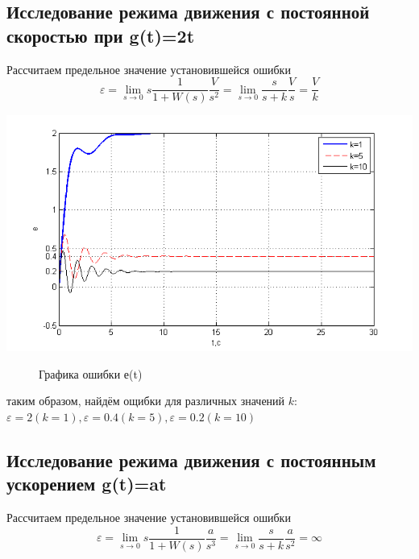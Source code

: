 \documentclass[a4paper, 11pt]{article}
\begin{document}
\subsection*{Исследование режима движения с постоянной скоростью при g(t)=2t}\hfill\par
Рассчитаем предельное значение установившейся ошибки
\begin{equation}
\varepsilon  = \mathop {\lim }\limits_{s \to 0} s\frac{1}{{1 + W(s)}}\frac{V}{{{s^2}}} = \mathop {\lim }\limits_{s \to 0} \frac{s}{{s + k}}\frac{V}{s} = \frac{V}{k}
\end{equation}



\begin{center}
	\includegraphics[width=0.7\linewidth]{6}
	\begin{figure}[h]
		\centering
		
		\caption{Графика ошибки е(t)}
		\label{fig:6}
	\end{figure}
\end{center}

таким образом, найдём ощибки для различных значений $k$:
$\varepsilon=2 (k=1), \varepsilon=0.4 (k=5), \varepsilon=0.2 (k=10)$

\subsection*{Исследование режима движения с постоянным ускорением g(t)=at}\hfill\par

Рассчитаем предельное значение установившейся ошибки
\begin{equation}
\varepsilon  = \mathop {\lim }\limits_{s \to 0} s\frac{1}{{1 + W(s)}}\frac{a}{{{s^3}}} = \mathop {\lim }\limits_{s \to 0} \frac{s}{{s + k}}\frac{a}{{{s^2}}} = \infty
\end{equation}
\end{document}
